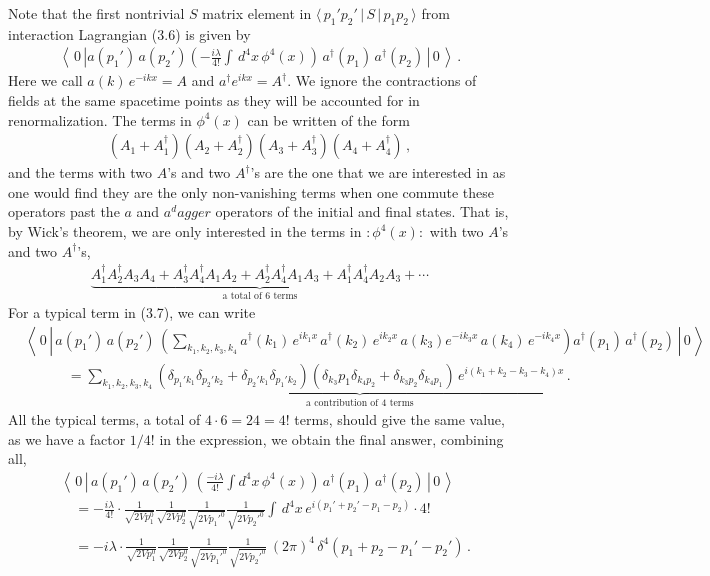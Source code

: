 \documentclass[11pt, onesided]{book}
\theoremstyle{break}
\theoremstyle{break}
\begin{document}
Note that the first nontrivial $S$ matrix element in $\langle\, p_1'p_2'\,|\,S\,|\,p_1p_2\,\rangle$ from interaction Lagrangian (3.6) is given by
\begin{align*}
\left\langle \, 0 \, \left| a(p_1')\,a(p_2') \left(-\frac{i\lambda}{4!}\int \, d^4x \,\phi^4(x)  \right)\, a^{\dagger}(p_1)\, a^{\dagger}(p_2)\,\right|\,0\,\right\rangle\,.
\end{align*}
Here we call $a(k)\, e^{-ikx} = A$ and $a^{\dagger}e^{ikx} = A^\dagger$. We ignore the contractions of fields at the same spacetime points as they will be accounted for in renormalization. The terms in $\phi^4(x) $ can be written of the form
\begin{align*}
(A_1 + A_1^\dagger) (A_2+A_2^\dagger)(A_3+A_3^\dagger)(A_4+A_4^\dagger)\,,
\end{align*}
and the terms with two $A$'s and two $A^\dagger$'s are the one that we are interested in as one would find they are the only non-vanishing terms when one commute these operators past the $a$ and $a^dagger$ operators of the initial and final states. That is, by Wick's theorem, we are only interested in the terms in $: \phi^4(x) : $ with two $A$'s and two $A^\dagger$'s, 
\begin{align}
\underbrace{A^{\dagger}_1 A^{\dagger}_2 A_3 A_4 + A_3^\dagger A_4^\dagger A_1A_2 + A_2^\dagger A_4^\dagger A_1A_3 + A_1^\dagger A_4^\dagger A_2A_3 + \cdots}_{\text{a total of 6 terms}}
\end{align}
For a typical term in (3.7), we can write
\begin{align*}
&\left\langle\,0\,\left|\, a(p_1')\,a(p_2')\,\left( \sum_{k_1,k_2,k_3,k_4}a^\dagger(k_1)\,e^{ik_1x}\, a^\dagger(k_2) \, e^{ik_2x}\, a(k_3) e^{-ik_3x}\, a(k_4)\, e^{-ik_4x}\right) a^\dagger(p_1)\, a^\dagger(p_2)\, \right|\,0\,\right\rangle\\
&{}\qquad\quad  =\sum_{k_1,k_2,k_3,k_4}\underbrace{(\delta_{p_1'k_1}\delta_{p_2'k_2} + \delta_{p_2'k_1}\delta_{p_1'k_2}) (\delta_{k_3}p_1\delta_{k_4p_2}+ \delta_{k_3p_2}\delta_{k_4p_1})\,e^{i(k_1+k_2 - k_3 - k_4)x}}_{\text{a contribution of 4 terms}} \,.
\end{align*}
All the typical terms, a total of $4\cdot 6 = 24 = 4!$ terms, should give the same value, as we have a factor $1/4!$ in the expression, we obtain the final answer, combining all,
\begin{align*}
&\left\langle \,0 \, \left|\, a(p_1')\,a(p_2')\, \left(\frac{-i\lambda}{4!}\int d^4x\, \phi^4(x)\right)\, a^\dagger(p_1)\, a^\dagger(p_2)\, \right| \,0 \,\right\rangle\\
&{}\quad =-\frac{i\lambda}{4!}\cdot \frac{1}{\sqrt{2Vp_1^0}}\frac{1}{\sqrt{2Vp_2^0}}\frac{1}{\sqrt{2Vp_1'^0}}\frac{1}{\sqrt{2Vp_2'^0}} \int \, d^4 x\, e^{i(p_1'+p_2' - p_1-p_2)} \cdot 4! \\
&{}\quad =-i\lambda\cdot \frac{1}{\sqrt{2Vp_1^0}}\frac{1}{\sqrt{2Vp_2^0}}\frac{1}{\sqrt{2Vp_1'^0}}\frac{1}{\sqrt{2Vp_2'^0}}\, (2\pi)^4 \,\delta^4(p_1+p_2 - p_1' - p_2')\,.
\end{align*}
\end{document}
